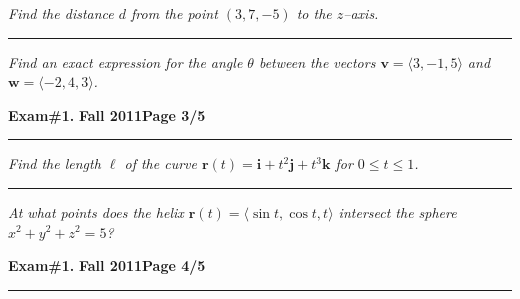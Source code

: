\documentclass[12pt]{article}
\begin{document}
\bigskip
{\problem[15 pts] \em  Find the distance $d$ from the point $(3,7,-5)$ to the $z$--axis.} 
\vspace{8.5cm}
\begin{flushright}
\end{flushright}
\hrule
{\problem[15 pts] \em Find an exact expression for the angle $\theta$ between
the vectors $\boldsymbol{v}=\langle 3, -1, 5\rangle$ and
$\boldsymbol{w}=\langle -2, 4, 3\rangle$.} 
\vspace{8.5cm}
\begin{flushright}
\end{flushright}
\newpage

\hfill{\large\bf Exam\#1.}\hfill{\large\bf
  Fall 2011}\hfill{\large\bf Page 3/5}\hrule

\bigskip
{\problem[15 pts] \em Find the length $\ell$ of the curve $\boldsymbol{r}(t) =
\boldsymbol{i} + t^2 \boldsymbol{j} + t^3 \boldsymbol{k}$ for $0 \leq t \leq
1$.} 
\vspace{9.5cm}
\begin{flushright}
\end{flushright}
\hrule
{\problem[10 pts] \em At what points does the helix $\boldsymbol{r}(t) = \langle \sin t, \cos t, t \rangle$ intersect the sphere $x^2+y^2+z^2=5$?}
\vspace{7.5cm}
\begin{flushright}
\end{flushright}
\newpage

\hfill{\large\bf Exam\#1.}\hfill{\large\bf
  Fall 2011}\hfill{\large\bf Page 4/5}\hrule
\end{document}
